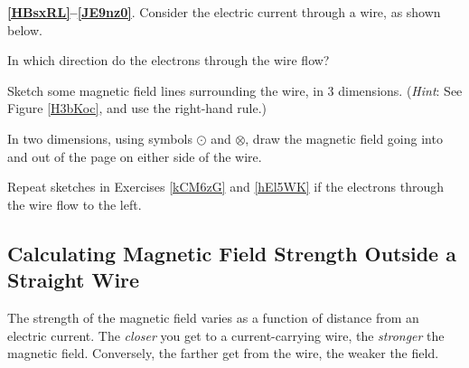 \documentclass[main.tex]{subfiles}
\begin{document}
\cyanhrule 

\vspace{1em}

\textbf{\ref{HBsxRL}--\ref{JE9nz0}}. Consider the electric current through a wire, as shown below.

\begin{center}
\end{center}

\begin{exercise} \label{HBsxRL}
    In which direction do the electrons through the wire flow?
\end{exercise}

\begin{exercise} \label{kCM6zG}
    Sketch some magnetic field lines surrounding the wire, in 3 dimensions. (\textit{Hint}: See Figure \ref{H3bKoc}, and use the right-hand rule.)
\end{exercise}

\begin{exercise} \label{hEl5WK}
    In two dimensions, using symbols $\odot$ and $\otimes$, draw the magnetic field going into and out of the page on either side of the wire.
\end{exercise}

\begin{exercise} \label{JE9nz0}
    Repeat sketches in Exercises \ref{kCM6zG} and \ref{hEl5WK} if the electrons through the wire flow to the left. 
\end{exercise}

\clearpage

\subsection{Calculating Magnetic Field Strength Outside a Straight Wire} \label{NErSiN}
The strength of the magnetic field varies as a function of distance from an electric current. The \textit{closer} you get to a current-carrying wire, the \textit{stronger} the magnetic field. Conversely, the farther get from the wire, the weaker the field. 

\begin{center}
\end{center}
\end{document}
